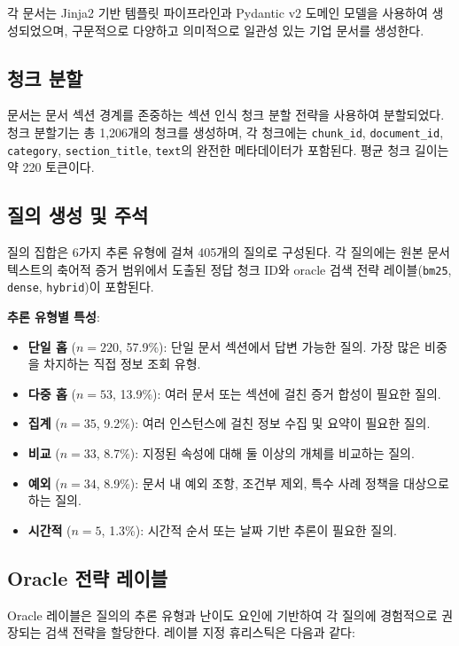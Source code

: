 각 문서는 Jinja2 기반 템플릿 파이프라인과 Pydantic v2 도메인 모델을 사용하여 생성되었으며, 구문적으로 다양하고 의미적으로 일관성 있는 기업 문서를 생성한다.

\subsection{청크 분할}

문서는 문서 섹션 경계를 존중하는 섹션 인식 청크 분할 전략을 사용하여 분할되었다. 청크 분할기는 총 1,206개의 청크를 생성하며, 각 청크에는 \texttt{chunk\_id}, \texttt{document\_id}, \texttt{category}, \texttt{section\_title}, \texttt{text}의 완전한 메타데이터가 포함된다. 평균 청크 길이는 약 220 토큰이다.

\subsection{질의 생성 및 주석}

질의 집합은 6가지 추론 유형에 걸쳐 405개의 질의로 구성된다. 각 질의에는 원본 문서 텍스트의 축어적 증거 범위에서 도출된 정답 청크 ID와 oracle 검색 전략 레이블(\texttt{bm25}, \texttt{dense}, \texttt{hybrid})이 포함된다.

\textbf{추론 유형별 특성}:
\begin{itemize}
    \item \textbf{단일 홉} ($n{=}220$, 57.9\%): 단일 문서 섹션에서 답변 가능한 질의. 가장 많은 비중을 차지하는 직접 정보 조회 유형.
    \item \textbf{다중 홉} ($n{=}53$, 13.9\%): 여러 문서 또는 섹션에 걸친 증거 합성이 필요한 질의.
    \item \textbf{집계} ($n{=}35$, 9.2\%): 여러 인스턴스에 걸친 정보 수집 및 요약이 필요한 질의.
    \item \textbf{비교} ($n{=}33$, 8.7\%): 지정된 속성에 대해 둘 이상의 개체를 비교하는 질의.
    \item \textbf{예외} ($n{=}34$, 8.9\%): 문서 내 예외 조항, 조건부 제외, 특수 사례 정책을 대상으로 하는 질의.
    \item \textbf{시간적} ($n{=}5$, 1.3\%): 시간적 순서 또는 날짜 기반 추론이 필요한 질의.
\end{itemize}

\subsection{Oracle 전략 레이블}
\label{sec:method_oracle_ko}

Oracle 레이블은 질의의 추론 유형과 난이도 요인에 기반하여 각 질의에 경험적으로 권장되는 검색 전략을 할당한다. 레이블 지정 휴리스틱은 다음과 같다:

